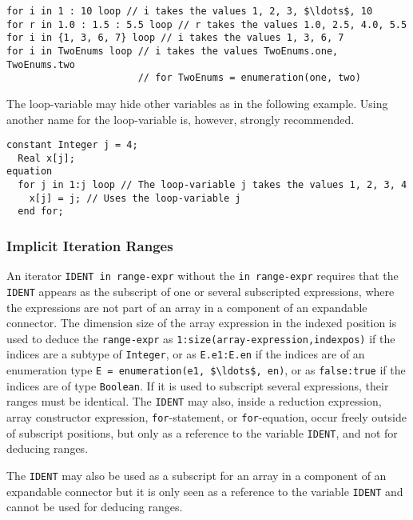 \begin{example}
\begin{lstlisting}[language=modelica]
for i in 1 : 10 loop // i takes the values 1, 2, 3, $\ldots$, 10
for r in 1.0 : 1.5 : 5.5 loop // r takes the values 1.0, 2.5, 4.0, 5.5
for i in {1, 3, 6, 7} loop // i takes the values 1, 3, 6, 7
for i in TwoEnums loop // i takes the values TwoEnums.one, TwoEnums.two
                       // for TwoEnums = enumeration(one, two)
\end{lstlisting}
The loop-variable may hide other variables as in the following example.
Using another name for the loop-variable is, however, strongly recommended.
\begin{lstlisting}[language=modelica]
  constant Integer j = 4;
  Real x[j];
equation
  for j in 1:j loop // The loop-variable j takes the values 1, 2, 3, 4
    x[j] = j; // Uses the loop-variable j
  end for;
\end{lstlisting}
\end{example}

\subsubsection{Implicit Iteration Ranges}\label{implicit-iteration-ranges}

An iterator \lstinline!IDENT in range-expr! without the \lstinline!in range-expr! requires that the \lstinline!IDENT! appears as the subscript of one or several subscripted expressions, where the expressions are not part of an array in a component of an expandable connector.
The dimension size of the array expression in the indexed position is used to deduce the \lstinline!range-expr! as \lstinline!1:size(array-expression,indexpos)! if the indices are a subtype of \lstinline!Integer!, or as \lstinline!E.e1:E.en! if the indices are of an enumeration type \lstinline!E = enumeration(e1, $\ldots$, en)!, or as \lstinline!false:true! if the indices are of type \lstinline!Boolean!.
If it is used to subscript several expressions, their ranges must be identical.
The \lstinline!IDENT! may also, inside a reduction expression, array constructor expression, \lstinline!for!-statement, or \lstinline!for!-equation, occur freely outside of subscript positions, but only as a reference to the variable \lstinline!IDENT!, and not for deducing ranges.

The \lstinline!IDENT! may also be used as a subscript for an array in a component of an expandable connector but it is only seen as a reference to the variable \lstinline!IDENT! and cannot be used for deducing ranges.

